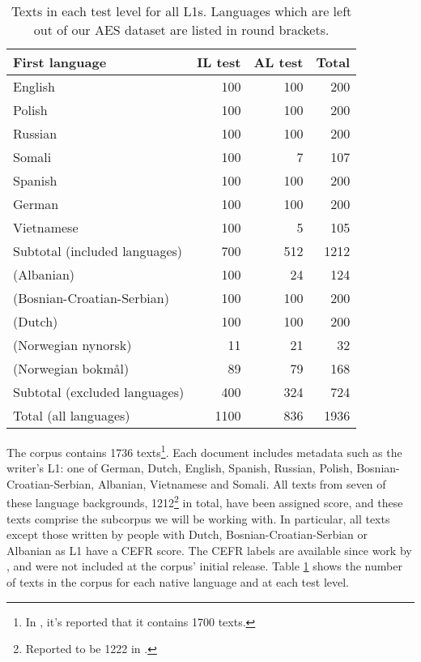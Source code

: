 \begin{table}
  \centering
  \begin{tabular}{lrrr}
    \toprule
    First language             & IL test & AL test & Total \\
    \midrule
    English                    &     100 &     100 &   200 \\
    Polish                     &     100 &     100 &   200 \\
    Russian                    &     100 &     100 &   200 \\
    Somali                     &     100 &       7 &   107 \\
    Spanish                    &     100 &     100 &   200 \\
    German                     &     100 &     100 &   200 \\
    Vietnamese                 &     100 &       5 &   105 \\
    \midrule
    Subtotal (included languages) &  700 &     512 &  1212 \\ \addlinespace
    \midrule
    (Albanian)                 &     100 &      24 &   124 \\
    (Bosnian-Croatian-Serbian) &     100 &     100 &   200 \\
    (Dutch)                    &     100 &     100 &   200 \\
    (Norwegian nynorsk)        &      11 &      21 &    32 \\
    (Norwegian bokmål)         &      89 &      79 &   168 \\
    \midrule
    Subtotal (excluded languages) &  400 &     324 &   724 \\ \addlinespace
    \midrule
    Total (all languages)      &    1100 &     836 &  1936 \\
    \bottomrule
  \end{tabular}
  \caption[Distributions of first languages for each test level in ASK]{
    Texts in each test level for all \acp{L1}. Languages which are
    left out of our AES dataset are listed in round brackets.
  }
  \label{tab:l1-and-testlevel}
\end{table}

The corpus contains 1736 texts\footnote{In
\textcite{carlsen2012proficiency,malmasi15,malmasi17}, it's reported that it
contains 1700 texts.}. Each document includes metadata such as the writer's
L1: one of German, Dutch, English, Spanish, Russian, Polish,
Bosnian-Croatian-Serbian, Albanian, Vietnamese and Somali. All texts from
seven of these language backgrounds, 1212\footnote{Reported to be 1222 in
\textcite{carlsen2012proficiency}.} in total, have been assigned 
score, and these texts comprise the subcorpus we will be working with. In
particular, all texts except those written by people with Dutch,
Bosnian-Croatian-Serbian or Albanian as L1 have a CEFR score. The CEFR labels
are available since work by \textcite{carlsen2012proficiency}, and were not
included at the corpus' initial release. Table \ref{tab:l1-and-testlevel}
shows the number of texts in the corpus for each native language and at each
test level.

